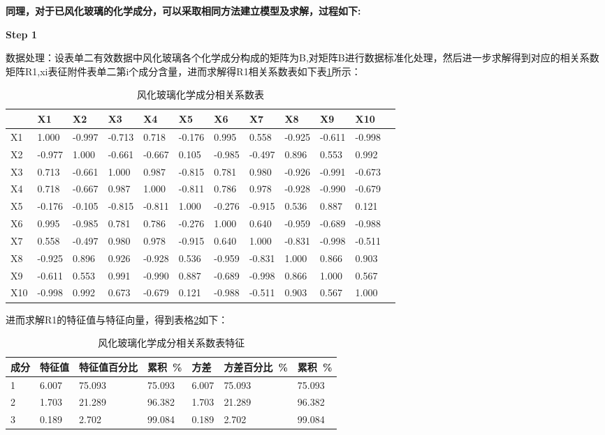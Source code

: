 \documentclass{my_paper}
\begin{document}
\textbf{同理，对于已风化玻璃的化学成分，可以采取相同方法建立模型及求解，过程如下:}\par

\textbf{Step 1} \par
数据处理：设表单二有效数据中风化玻璃各个化学成分构成的矩阵为B,对矩阵B进行数据标准化处理，然后进一步求解得到对应的相关系数矩阵R1,xi表征附件表单二第i个成分含量，进而求解得R1相关系数表如下表\ref{风化玻璃化学成分相关系数表}所示：
\begin{table}[H]
 \centering
 \caption{风化玻璃化学成分相关系数表}
  \label{风化玻璃化学成分相关系数表}
 \begin{tabular}{llllllllllll}
 \hline
            & X1 & X2 & X3 & X4 & X5 & X6 & X7 & X8 & X9 & X10 \\ \hline
         X1 & 1.000  & -0.997  & -0.713  & 0.718  & -0.176  & 0.995  & 0.558  & -0.925  & -0.611  & -0.998  \\ 
         X2 & -0.977  & 1.000  & -0.661  & -0.667  & 0.105  & -0.985  & -0.497  & 0.896  & 0.553  & 0.992  \\ 
         X3 & 0.713  & -0.661  & 1.000  & 0.987  & -0.815  & 0.781  & 0.980  & -0.926  & -0.991  & -0.673  \\ 
         X4 & 0.718  & -0.667  & 0.987  & 1.000  & -0.811  & 0.786  & 0.978  & -0.928  & -0.990  & -0.679  \\ 
         X5 & -0.176  & -0.105  & -0.815  & -0.811  & 1.000  & -0.276  & -0.915  & 0.536  & 0.887  & 0.121  \\ 
         X6 & 0.995  & -0.985  & 0.781  & 0.786  & -0.276  & 1.000  & 0.640  & -0.959  & -0.689  & -0.988  \\ 
         X7 & 0.558  & -0.497  & 0.980  & 0.978  & -0.915  & 0.640  & 1.000  & -0.831  & -0.998  & -0.511  \\ 
         X8 & -0.925  & 0.896  & 0.926  & -0.928  & 0.536  & -0.959  & -0.831  & 1.000  & 0.866  & 0.903  \\ 
         X9 & -0.611  & 0.553  & 0.991  & -0.990  & 0.887  & -0.689  & -0.998  & 0.866  & 1.000  & 0.567  \\ 
         X10 & -0.998  & 0.992  & 0.673  & -0.679  & 0.121  & -0.988  & -0.511  & 0.903  & 0.567  & 1.000 \\ \hline
    \end{tabular}
\end{table}

\newpage
进而求解R1的特征值与特征向量，得到表格\ref{风化玻璃化学成分相关系数表特征}如下：
\begin{table}[H]
    \centering
    \caption{风化玻璃化学成分相关系数表特征}
    \label{风化玻璃化学成分相关系数表特征}
    \begin{tabular}{lllllll}
    \hline
       成分 & 特征值 & 特征值百分比 & 累积 \% & 方差 & 方差百分比 \% & 累积 \% \\ \hline
        1 & 6.007 & 75.093 & 75.093 & 6.007 & 75.093 & 75.093 \\ 
        2 & 1.703 & 21.289 & 96.382 & 1.703 & 21.289 & 96.382 \\ 
        3 & 0.189 & 2.702 & 99.084 & 0.189 & 2.702 & 99.084 \\ \hline
    \end{tabular}
\end{table}
\end{document}
